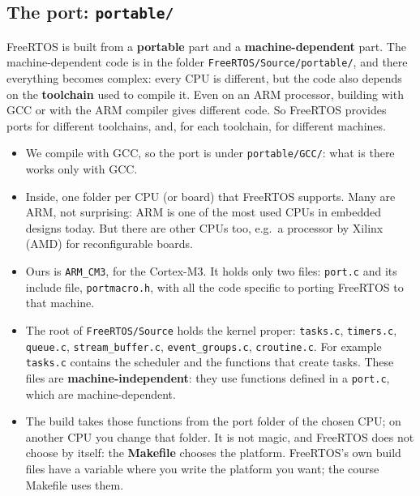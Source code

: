 \subsection{The port: \texttt{portable/}}
FreeRTOS is built from a \textbf{portable} part and a \textbf{machine-dependent} part. The machine-dependent code is in the folder \texttt{FreeRTOS/Source/portable/}, and there everything becomes complex: every CPU is different, but the code also depends on the \textbf{toolchain} used to compile it. Even on an ARM processor, building with GCC or with the ARM compiler gives different code. So FreeRTOS provides ports for different toolchains, and, for each toolchain, for different machines.
\begin{itemize}
    \item We compile with GCC, so the port is under \texttt{portable/GCC/}: what is there works only with GCC.
    \item Inside, one folder per CPU (or board) that FreeRTOS supports. Many are ARM, not surprising: ARM is one of the most used CPUs in embedded designs today. But there are other CPUs too, e.g.\ a processor by Xilinx (AMD) for reconfigurable boards.
    \item Ours is \texttt{ARM\_CM3}, for the Cortex-M3. It holds only two files: \texttt{port.c} and its include file, \texttt{portmacro.h}, with all the code specific to porting FreeRTOS to that machine.
    \item The root of \texttt{FreeRTOS/Source} holds the kernel proper: \texttt{tasks.c}, \texttt{timers.c}, \texttt{queue.c}, \texttt{stream\_buffer.c}, \texttt{event\_groups.c}, \texttt{croutine.c}. For example \texttt{tasks.c} contains the scheduler and the functions that create tasks. These files are \textbf{machine-independent}: they use functions defined in a \texttt{port.c}, which are machine-dependent.
    \item The build takes those functions from the port folder of the chosen CPU; on another CPU you change that folder. It is not magic, and FreeRTOS does not choose by itself: the \textbf{Makefile} chooses the platform. FreeRTOS's own build files have a variable where you write the platform you want; the course Makefile uses them.
\end{itemize}

